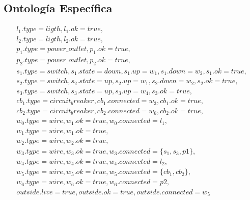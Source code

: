 \documentclass[10pt, a4paper,spanish]{article}
\begin{document}
		\subsection{Ontología Específica}

			\begin{equation*}
				\begin{split}
					l_1.type=ligth, l_1.ok=true, \\
					l_2.type=ligth, l_2.ok=true, \\
					p_1.type=power\_outlet, p_1.ok=true, \\
					p_2.type=power\_outlet, p_2.ok=true, \\
					s_1.type=switch, s_1.state=down, s_1.up=w_1, s_1.down=w_2, s_1.ok=true, \\
					s_2.type=switch, s_2.state=up, s_2.up=w_1, s_2.down=w_2, s_2.ok=true, \\
					s_3.type=switch, s_3.state=up, s_3.up=w_4, s_3.ok=true, \\
					cb_1.type=circuit_breaker, cb_1.connected=w_3, cb_1.ok=true,\\
					cb_2.type=circuit_breaker, cb_2.connected=w_6, cb_2.ok=true,\\
					w_0.type=wire, w_1.ok=true, w_0.connected=l_1,\\
					w_1.type=wire, w_1.ok=true, \\
					w_2.type=wire, w_2.ok=true, \\
					w_3.type=wire, w_3.ok=true, w_3.connected=\{s_1, s_3, p1\}, \\
					w_4.type=wire, w_4.ok=true, w_4.connected=l_2, \\
					w_5.type=wire, w_5.ok=true, w_5.connected=\{cb_1, cb_2\}, \\
					w_6.type=wire, w_6.ok=true, w_6.connected=p2, \\
					outside.live=true, outside.ok=true, outside.connected=w_5
				\end{split}
			\end{equation*}
\end{document}
